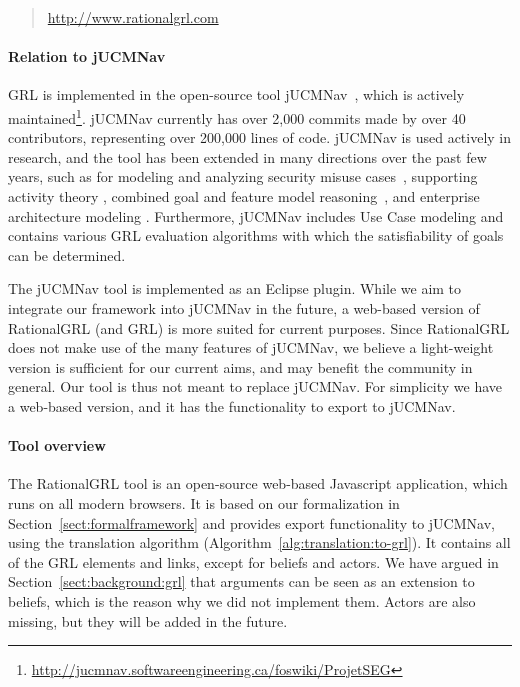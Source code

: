 \begin{quote}
\url{http://www.rationalgrl.com}
\end{quote}

\paragraph{Relation to jUCMNav} 

GRL is implemented in the open-source tool jUCMNav~\cite{jUCMNav}, which is actively maintained\footnote{\url{http://jucmnav.softwareengineering.ca/foswiki/ProjetSEG}}. jUCMNav currently has over 2,000 commits made by over 40 contributors, representing over 200,000 lines of code. jUCMNav is used actively in research, and the tool has been extended in many directions over the past few years, such as for modeling and analyzing security misuse cases~\cite{daramola2012ontology}, supporting activity theory \cite{georg2015synergy}, combined goal and feature model reasoning~\cite{liu2014combined}, and enterprise architecture modeling \cite{marosin-etal:caise2016}. Furthermore, jUCMNav includes Use Case modeling and contains various GRL evaluation algorithms with which the satisfiability of goals can be determined. 

The jUCMNav tool is implemented as an Eclipse plugin. While we aim to integrate our framework into jUCMNav in the future, a web-based version of RationalGRL (and GRL) is more suited for current purposes. Since RationalGRL does not make use of the many features of jUCMNav, we believe a light-weight version is sufficient for our current aims, and may benefit the community in general. Our tool is thus not meant to replace jUCMNav. For simplicity we have a web-based version, and it has the functionality to export to jUCMNav.

\paragraph{Tool overview} The RationalGRL tool is an open-source web-based Javascript application, which runs on all modern browsers. It is based on our formalization in Section~\ref{sect:formalframework} and provides export functionality to jUCMNav, using the translation algorithm (Algorithm~\ref{alg:translation:to-grl}). It contains all of the GRL elements and links, except for beliefs and actors. We have argued in Section~\ref{sect:background:grl} that arguments can be seen as an extension to beliefs, which is the reason why we did not implement them. Actors are also missing, but they will be added in the future.

